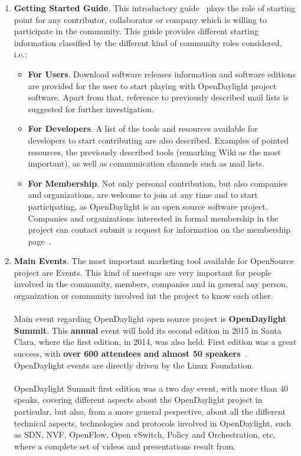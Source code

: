 \documentclass[a4paper, 12pt]{book}
\begin{document}
\begin{enumerate}
\item{\textbf{Getting Started Guide}}. This introductory guide~\cite{OpenDaylightStGuide} plays the role of starting point for any contributor, collaborator or company which is willing to participate in the community. This guide provides different starting information classified by the different kind of community roles considered, i.e.:
\begin{itemize}\itemsep0pt
\item{\textbf{For Users}}. Download software releases information and software editions are provided for the user to start playing with OpenDaylight project software. Apart from that, reference to previously described mail lists is suggested for further investigation.
\item{\textbf{For Developers}}. A list of the tools and resources available for developers to start contributing are also described. Examples of pointed resources, the previously described tools (remarking Wiki as the most important), as well as communication channels such as mail lists.
\item{\textbf{For Membership}}. Not only personal contribution, but also companies and organizations, are welcome  to join at any time and to start participating, as OpenDaylight is an open source software project. Companies and organizations interested in formal membership in the project can contact submit a request for information on the membership page~\cite{OpenDaylightJoin}.
\end{itemize}
\item{\textbf{Main Events}}. The most important marketing tool available for OpenSource project are Events. This kind of meetups are very important for people involved in the community, members, companies and in general any person, organization or community involved int the project to know each other.\\
\\
Main event regarding OpenDaylight open source project is \textbf{OpenDaylight Summit}. This \textbf{annual} event will hold its second edition in 2015 in Santa Clara, where the first edition, in 2014, was also held. First edition was a great success, with \textbf{over 600 attendees and almost 50 speakers}~\cite{OpenDaylight2014Summit}. OpenDaylight events are directly driven by the Linux Foundation.\\
\\
OpenDaylight Summit first edition was a two day event, with more than 40 speaks, covering different aspects about the OpenDaylight project in particular, but also, from a more general pespective, about all the different technical aspects, technologies and protocols involved in OpenDaylight, such as SDN, NVF, OpenFlow, Open vSwitch, Policy and Orchestration, etc, where a complete set of videos and presentations result from.\\

\end{enumerate}
\end{document}
